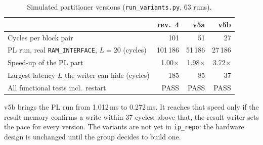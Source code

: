 \documentclass[11pt,a4paper]{article}
\newcommand{\code}[1]{\texttt{#1}}
\begin{document}
\begin{table}[H]
\centering
\begin{tabular}{@{}lrrr@{}}
\toprule
 & \textbf{rev.~4} & \textbf{v5a} & \textbf{v5b} \\
\midrule
Cycles per block pair & 101 & 51 & 27 \\
PL run, real \code{RAM\_INTERFACE}, $L = 20$ (cycles) & 101\,186 & 51\,186 & 27\,186 \\
Speed-up of the PL part & 1.00$\times$ & 1.98$\times$ & 3.72$\times$ \\
Largest latency $L$ the writer can hide (cycles) & 185 & 85 & 37 \\
All functional tests incl.\ restart & PASS & PASS & PASS \\
\bottomrule
\end{tabular}
\caption{Simulated partitioner versions (\code{run\_variants.py}, 63 runs).}
\end{table}

v5b brings the PL run from 1.012\,ms to 0.272\,ms. It reaches that speed only if the result memory confirms a write within 37 cycles; above that, the result writer sets the pace for every version. The variants are not yet in \code{ip\_repo}: the hardware design is unchanged until the group decides to build one.

\end{document}
